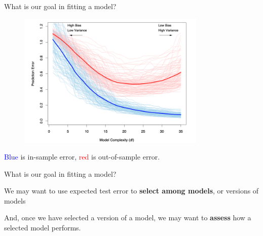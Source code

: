 \documentclass[xcolor={table}, handout]{beamer}
\begin{document}
\begin{frame}{What is our goal in fitting a model?}


\begin{figure}
\centering
\includegraphics[width = 0.8\textwidth]{../assets/tibshirani7-1.png}
\end{figure}
\hfill \cite{hastie2009elements}

\textcolor{blue}{Blue} is in-sample error, \textcolor{red}{red} is out-of-sample error.

\end{frame}





\begin{frame}{What is our goal in fitting a model?}

\begin{wideitemize}
\item We may want to use expected test error to \textbf{select among models}, or versions of models\pause
\item And, once we have selected a version of a model, we may want to \textbf{assess} how a selected model performs. 
\end{wideitemize}

\end{frame}


\end{document}
